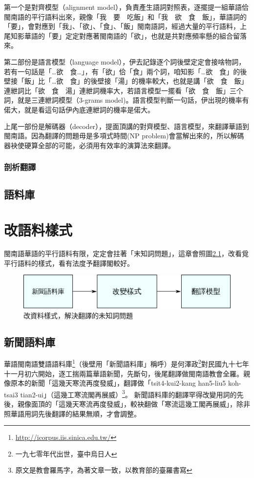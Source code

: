\documentclass[final,oneside,onecolumn,12pt,a4paper]{book}%
\begin{document}
第一个是對齊模型（alignment model），負責產生語詞對照表，逐擺提一組華語佮閩南語的平行語料出來，親像「我　要　吃飯」和「我　欲　食　飯」，華語詞的「要」，會對應到「我」、「欲」、「食」、「飯」閩南語詞，經過大量的平行語料，上尾知影華語的「要」定定對應著閩南語的「欲」，也就是共對應頻率懸的組合留落來。

第二部份是語言模型（language model），伊去記錄逐个詞後壁定定會接啥物詞，若有一句話是「…欲　食…」，有「欲」佮「食」兩个詞，咱知影「…欲　食」的後壁接「飯」比「…欲　食」的後壁接「湯」的機率較大，也就是講「欲　食　飯」連紲詞比「欲　食　湯」連紲詞機率大，若語言模型一擺看「欲　食　飯」三个詞，就是三連紲詞模型（3-grams model)。語言模型判斷一句話，伊出現的機率有偌大，就是看這句話伊內底連紲詞的機率是偌大。

上尾一部份是解碼器（decoder），提面頂講的對齊模型、語言模型，來翻譯華語到閩南語。因為翻譯的問題毋是多項式時間(NP problem)會當解出來的，所以解碼器袂使硬算全部的可能，必須用有效率的演算法來翻譯。

\subsection{剖析翻譯}
\label{小節：剖析翻譯}


\section{語料庫}
\label{節：語料庫}


\chapter{改語料樣式}
\label{章：語料樣式}
閩南語華語的平行語料有限，定定會拄著「末知詞問題」，這章會照圖\ref{圖：改語料樣式架構}，改看覓平行語料的樣式，看有法度予翻譯閣較好。

\begin{figure}
\centerline{\includegraphics[keepaspectratio]{圖/語料格式架構圖}}
\caption{改資料樣式，解決翻譯的未知詞問題}
\label{圖：改語料樣式架構}
\end{figure}

\section{新聞語料庫}
\label{節：新聞語料庫}
華語閩南語雙語語料庫\footnote{\url{http://icorpus.iis.sinica.edu.tw/}}（後壁用「新聞語料庫」稱呼）是何澤政\footnote{一九七零年代出世，臺中烏日人}對民國九十七年十一月初六開始，逐工揣兩篇華語新聞，先斷句，後尾翻譯做閩南語教會全羅。親像原本的新聞「這幾天寒流再度發威」，翻譯做「tsit4-kui2-kang han5-liu5 koh-tsai3 tian2-ui」（這幾工寒流閣再展威）\footnote{原文是教會羅馬字，為著文章一致，以教育部的臺羅書寫}。
新聞語料庫的翻譯罕得改變用詞的先後，親像面頂的「這幾天寒流再度發威」，較袂翻做「寒流這幾工閣再展威」，除非照華語用詞先後翻譯的結果無順，才會調整。
\end{document}
